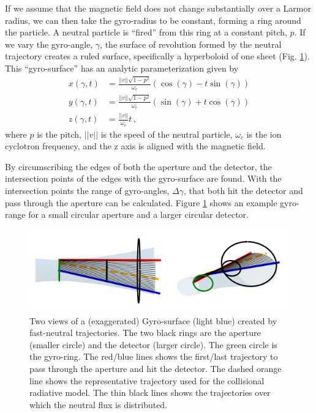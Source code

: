 If we assume that the magnetic field does not change substantially over a Larmor radius, we can then take the gyro-radius to be constant, forming a ring around the particle. A neutral particle is ``fired'' from this ring at a constant pitch, $p$. If we vary the gyro-angle, $\gamma$, the surface of revolution formed by the neutral trajectory creates a ruled surface, specifically a hyperboloid of one sheet (Fig. \ref{fig:npa_intersect}). This ``gyro-surface'' has an analytic parameterization given by
\begin{equation}\label{eq:hyperboloid}
\begin{split}
    x(\gamma,t) &= \frac{||v||\sqrt{1-p^2}}{\omega_c}\left(\cos(\gamma) - t\sin(\gamma)\right) \\
    y(\gamma,t) &= \frac{||v||\sqrt{1-p^2}}{\omega_c}\left(\sin(\gamma) + t\cos(\gamma)\right) \\
    z(\gamma,t) &= \frac{||v||}{\omega_c}t\,,
\end{split}
\end{equation}
where $p$ is the pitch, $||v||$ is the speed of the neutral particle, $\omega_c$ is the ion cyclotron frequency, and the z axis is aligned with the magnetic field.

By circumscribing the edges of both the aperture and the detector, the intersection points of the edges with the gyro-surface are found. With the intersection points the range of gyro-angles, $\Delta \gamma$, that both hit the detector and pass through the aperture can be calculated. Figure \ref{fig:npa_intersect} shows an example gyro-range for a small circular aperture and a larger circular detector.
\begin{figure}[h!]
    \centering
    \includegraphics[width=12cm]{figures/npa_intersection.jpg}
    \caption{Two views of a (exaggerated) Gyro-surface (light blue) created by fast-neutral trajectories. The two black rings are the aperture (smaller circle) and the detector (larger circle). The green circle is the gyro-ring. The red/blue lines shows the first/last trajectory to pass through the aperture and hit the detector. The dashed orange line shows the representative trajectory used for the collisional radiative model. The thin black lines shows the trajectories over which the neutral flux is distributed.}
    \label{fig:npa_intersect}
\end{figure}

